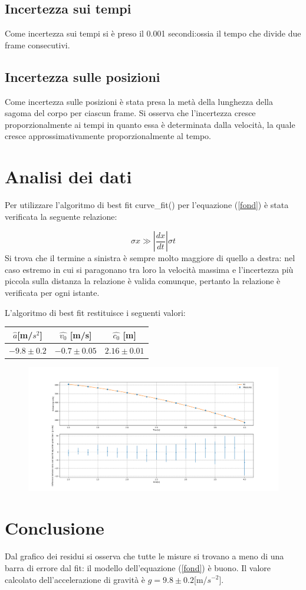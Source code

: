 \documentclass{article}
\begin{document}
\subsection{Incertezza sui tempi}
Come incertezza sui tempi si è preso il 0.001 secondi:ossia il tempo che divide due frame consecutivi.

\subsection{Incertezza sulle posizioni}
Come incertezza sulle posizioni è stata presa la metà della lunghezza della sagoma del corpo per ciascun frame.
Si osserva che l'incertezza cresce proporzionalmente ai tempi in quanto essa è determinata dalla velocità, la quale cresce approssimativamente proporzionalmente al tempo.

\section {Analisi dei dati}

Per utilizzare l'algoritmo di best fit curve\_fit() per l'equazione (\ref{fond}) è stata verificata la seguente relazione:

\begin{equation}
\sigma x\gg\left|\frac{dx}{dt}\right|\sigma t
\end{equation}
Si trova che il termine a sinistra è sempre molto maggiore di quello a destra: nel caso estremo in cui si paragonano tra loro la velocità massima e l'incertezza più piccola sulla distanza la relazione è valida comunque, pertanto la relazione è verificata per ogni istante.

L'algoritmo di best fit restituisce i seguenti valori:

\begin{center}
  \begin{tabular}{|c|c|c|}
    \hline
	$\hat{a} $[m/$s^2$] &  $ \hat{v_0} $ [m/s] & $ \hat{c_0}$ [m] \\
    \hline
	$-9.8\pm0.2$ & $-0.7\pm0.05$& $2.16\pm0.01$\\
   \hline
  \end{tabular}
\end{center}


\begin{figure}
	\includegraphics[width=\textwidth]{Falling_mass_plot.png}
\end{figure}

\section{Conclusione}
Dal grafico dei residui si osserva che tutte le misure si trovano a meno di una barra di errore dal fit: il modello dell'equazione (\ref{fond}) è buono.
Il valore calcolato dell'accelerazione di gravità è $g= 9.8\pm 0.2 $[m/$s^{-2}$].
\end{document}
